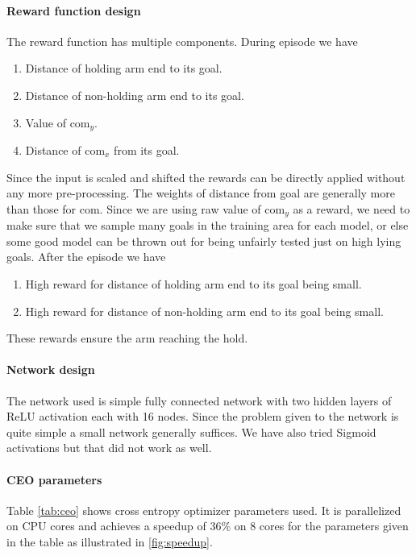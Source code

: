 \documentclass[12pt]{article}
\begin{document}
\paragraph{Reward function design}
The reward function has multiple components.
During episode we have
\begin{enumerate}[nolistsep]
    \item Distance of holding arm end to its goal.
    \item Distance of non-holding arm end to its goal.
    \item Value of com$_y$.
    \item Distance of com$_x$ from its goal.
\end{enumerate}
Since the input is scaled and shifted the rewards can be directly applied without any more pre-processing.
The weights of distance from goal are generally more than those for com.
Since we are using raw value of com$_y$ as a reward, we need to make sure that we sample many goals in the training area for each model, or else some good model can be thrown out for being unfairly tested just on high lying goals.
After the episode we have
\begin{enumerate}[nolistsep]
    \item High reward for distance of holding arm end to its goal being small.
    \item High reward for distance of non-holding arm end to its goal being small.
\end{enumerate}
These rewards ensure the arm reaching the hold.

\paragraph{Network design}
The network used is simple fully connected network with two hidden layers of ReLU activation each with 16 nodes.
Since the problem given to the network is quite simple a small network generally suffices.
We have also tried Sigmoid activations but that did not work as well.

\paragraph{CEO parameters}
Table \ref{tab:ceo} shows cross entropy optimizer parameters used.
It is parallelized on CPU cores and achieves a speedup of 36\% on 8 cores for the parameters given in the table as illustrated in \ref{fig:speedup}.
\end{document}
